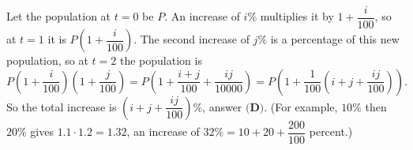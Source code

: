 Let the population at $t=0$ be $P$. An increase of $i\%$ multiplies it by $1+\dfrac{i}{100}$, so at $t=1$ it is $P\left(1+\dfrac{i}{100}\right)$. The second increase of $j\%$ is a percentage of this new population, so at $t=2$ the population is
\[
P\left(1+\dfrac{i}{100}\right)\left(1+\dfrac{j}{100}\right)=P\left(1+\dfrac{i+j}{100}+\dfrac{ij}{10000}\right)=P\left(1+\dfrac{1}{100}\left(i+j+\dfrac{ij}{100}\right)\right).
\]
So the total increase is $\left(i+j+\dfrac{ij}{100}\right)\%$, answer $\boxed{\textbf{(D)}}$. (For example, $10\%$ then $20\%$ gives $1.1\cdot1.2=1.32$, an increase of $32\%=10+20+\dfrac{200}{100}$ percent.)
